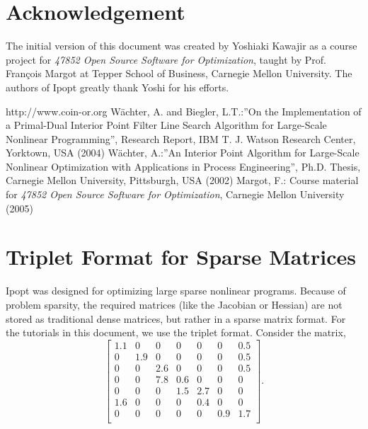 \documentclass[letter,10pt]{article}
\begin{document}
{\section*{Acknowledgement}
The initial version of this document was created by Yoshiaki Kawajir
as a course project for \textit{47852 Open Source Software for
Optimization}, taught by Prof. Fran\c cois Margot at Tepper School of
Business, Carnegie Mellon University. The authors of Ipopt greatly
thank Yoshi for his efforts.

\begin{thebibliography}{99}
http://www.coin-or.org
W\"achter, A. and Biegler, L.T.:''On the Implementation of a Primal-Dual
        Interior Point Filter Line Search Algorithm for Large-Scale
        Nonlinear Programming'', Research Report, IBM T. J. Watson
        Research Center, Yorktown, USA (2004)
W\"achter, A.:''An Interior Point Algorithm for Large-Scale Nonlinear
        Optimization with Applications in Process Engineering'',
        Ph.D. Thesis, Carnegie Mellon University, Pittsburgh, USA (2002)
Margot, F.: Course material for \textit{47852 Open Source Software for
        Optimization}, Carnegie Mellon University (2005)
\end{thebibliography}


\appendix
\section{Triplet Format for Sparse Matrices}\label{app.triplet}
Ipopt was designed for optimizing large sparse nonlinear programs. 
Because of problem sparsity, the required matrices (like the Jacobian or Hessian) are not stored as traditional dense matrices, but rather in a sparse matrix format. For the tutorials in this document, we use the triplet format. 
Consider the matrix,
\[
\left[
\begin{array}{ccccccc}
1.1     & 0             & 0             & 0             & 0             & 0             & 0.5 \\
0       & 1.9   & 0             & 0             & 0             & 0             & 0.5 \\
0       & 0             & 2.6   & 0             & 0             & 0             & 0.5 \\
0       & 0             & 7.8   & 0.6   & 0             & 0             & 0    \\
0       & 0             & 0             & 1.5   & 2.7   & 0             & 0     \\
1.6     & 0             & 0             & 0             & 0.4   & 0             & 0     \\
0       & 0             & 0             & 0             & 0             & 0.9   & 1.7 \\
\end{array}
\right].
\]

}
\end{document}
